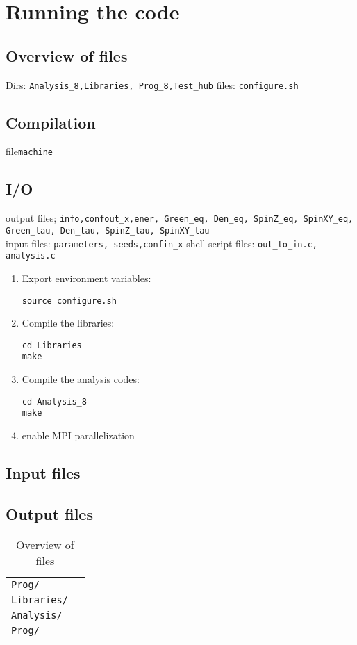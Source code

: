 \section{Running the code}\label{sec:io}

\subsection{Overview of files}
Dirs: \texttt{Analysis\_8,Libraries, Prog\_8,Test\_hub}
files: \texttt{configure.sh}

\subsection{Compilation}
file\texttt{machine} 
\subsection{I/O}
output files; \texttt{info,confout\_x,ener, Green\_eq, Den\_eq, SpinZ\_eq, SpinXY\_eq, Green\_tau, Den\_tau, SpinZ\_tau, SpinXY\_tau}\\
input files: \texttt{parameters, seeds,confin\_x}
shell script files: \texttt{out\_to\_in.c, analysis.c}



\begin{enumerate}
\item Export  environment variables:
\begin{verbatim}
source configure.sh
\end{verbatim}
\item Compile the libraries: 
\begin{verbatim}
cd Libraries
make
\end{verbatim}
\item Compile the analysis codes: 
\begin{verbatim}
cd Analysis_8
make
\end{verbatim}
\item enable MPI parallelization

\end{enumerate}

\subsection{Input files}

\subsection{Output files}
%
\begin{table}[h]
   \begin{tabular}{l l}
  \texttt{Prog/} & \\
  \texttt{Libraries/} & \\  
  \texttt{Analysis/} & \\
      
  \texttt{Prog/} & \\      
   \end{tabular}
   \caption{   Overview of files
    \label{table:files}}
\end{table}
%